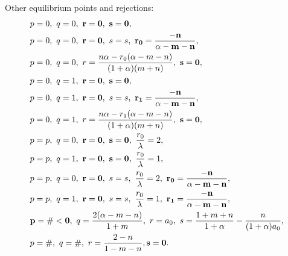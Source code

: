 \documentclass[a4paper,11pt]{article}
\begin{document}
Other equilibrium points and rejections:
\begin{align*}
 &p=0, \ q=0, \ {\bf r=0, \ s=0},\\
 &p=0, \ q=0, \ {\bf r=0},\ s=s, \ {\bf r_0 = \frac{-n}{\alpha-m-n}},\\
 &p=0, \ q=0, \ r = \frac{n\alpha - r_0(\alpha-m-n)}{(1+\alpha)(m+n)},\ {\bf s=0},\\
 &p=0, \ q=1, \ {\bf r=0, \ s=0}, \\
 &p=0, \ q=1, \ {\bf r=0},\ s=s, \ {\bf r_1 = \frac{-n}{\alpha-m-n}},\\
 &p=0, \ q=1, \ r = \frac{n\alpha - r_1(\alpha-m-n)}{(1+\alpha)(m+n)},\ {\bf s=0},\\
 &p=p, \ q=0, \ {\bf r=0, \ s=0}, \ \frac{r_0}{\lambda}=2, \\ 
 &p=p, \ q=1, \ {\bf r=0, \ s=0}, \ \frac{r_0}{\lambda}=1, \\
 &p=p, \ q=0, \ {\bf r=0}, \ s=s, \ \frac{r_0}{\lambda}=2, \ {\bf r_0 = \frac{-n}{\alpha-m-n}}, \\
 &p=p, \ q=1, \ {\bf r=0}, \ s=s, \ \frac{r_0}{\lambda}=1, \ {\bf r_1 = \frac{-n}{\alpha-m-n}}, \\
 &{\bf p=\#<0}, \ q=\frac{2(\alpha-m-n)}{1+m}, \ r=a_0, \ s=\frac{1+m+n}{1+\alpha} - \frac{n}{(1+\alpha)a_0},\\
 &p=\#, \ q=\#, \ r = \frac{2-n}{1-m-n}, {\bf s=0}.
\end{align*}
\end{document}
